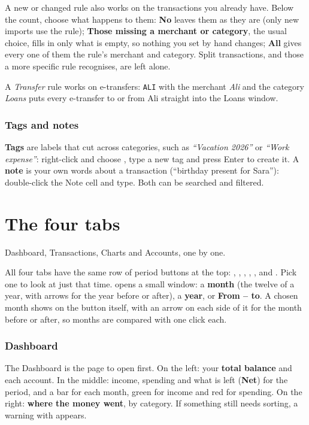 \documentclass[11pt]{article}
\begin{document}
A new or changed rule also works on the transactions you already have. Below the count, choose
what happens to them: \textbf{No} leaves them as they are (only new imports use the rule);
\textbf{Those missing a merchant or category}, the usual choice, fills in only what is empty, so
nothing you set by hand changes; \textbf{All} gives every one of them the rule's merchant and
category. Split transactions, and those a more specific rule recognises, are left alone.

\begin{tip}
A \emph{Transfer} rule works on e-transfers: \texttt{ALI} with the merchant \emph{Ali} and the category
\emph{Loans} puts every e-transfer to or from Ali straight into the Loans window.
\end{tip}

\subsection{Tags and notes}
\textbf{Tags} are labels that cut across categories, such as \emph{“Vacation 2026”} or \emph{“Work expense”}:
right-click and choose , type a new tag and press Enter to create it. A
\textbf{note} is your own words about a transaction (“birthday present for Sara”): double-click the
Note cell and type. Both can be searched and filtered.

\chapter{The four tabs}{Dashboard, Transactions, Charts and Accounts, one by one.}\label{ch:5}

All four tabs have the same row of period buttons at the top: , ,
, , ,  and .
Pick one to look at just that time.  opens a small window: a \textbf{month} (the
twelve of a year, with arrows for the year before or after), a \textbf{year}, or
\textbf{From – to}. A chosen month shows on the button itself, with an arrow on each side of it for
the month before or after, so months are compared with one click each.

\subsection{Dashboard}
The Dashboard is the page to open first. On the left: your \textbf{total balance} and each account.
In the middle: income, spending and what is left (\textbf{Net}) for the period, and a bar for each
month, green for income and red for spending. On the right: \textbf{where the money went}, by
category. If something still needs sorting, a warning with  appears.
\end{document}
